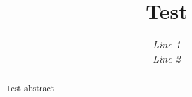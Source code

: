\documentclass{article}
\newcommand{\IEEEauthorblockA}[1]{\textit{#1}\\}
\begin{document}
\author{\IEEEauthorblockA{Line 1\\Line 2}}
\title{Test}
\maketitle
\begin{abstract}
Test abstract
\end{abstract}
\end{document}
